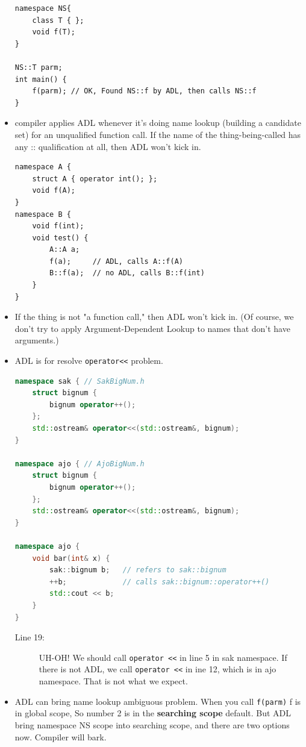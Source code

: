 \documentclass[a4paper,11pt,twoside]{book}
\begin{document}
\begin{itemize}
\begin{lstlisting}[numbers=none]
namespace NS{
	class T { };
	void f(T);
}
	
NS::T parm;
int main() {
	f(parm); // OK, Found NS::f by ADL, then calls NS::f
}
\end{lstlisting}

\item compiler applies ADL whenever it's doing name lookup (building a candidate set) for an unqualified function call. If the name of the thing-being-called has any :: qualification at all, then ADL won't kick in.

\begin{lstlisting}[numbers=none]
namespace A {
	struct A { operator int(); };
	void f(A);
}
namespace B {
	void f(int);
	void test() {
		A::A a;
		f(a);     // ADL, calls A::f(A)
		B::f(a);  // no ADL, calls B::f(int)
	}	
}
\end{lstlisting}

\item  If the thing is not "a function call," then ADL won't kick in. (Of course, we don't try to apply Argument-Dependent Lookup to names that don't have arguments.) 
	
\item ADL is for resolve \texttt{operator<<} problem.
\begin{lstlisting}[frame=single, language=c++]
namespace sak { // SakBigNum.h
	struct bignum {
		bignum operator++();
	};
	std::ostream& operator<<(std::ostream&, bignum); 
}

namespace ajo { // AjoBigNum.h
	struct bignum {
		bignum operator++();
	};
	std::ostream& operator<<(std::ostream&, bignum);
}
	
namespace ajo {
	void bar(int& x) {
		sak::bignum b;   // refers to sak::bignum
		++b;             // calls sak::bignum::operator++()
		std::cout << b;  
	}
}
\end{lstlisting}
\begin{description}
	\item[Line 19:] UH-OH! We should call \texttt{operator <<} in line 5 in sak namespace. If there is not ADL, we call \texttt{operator <<} in ine 12, which is in ajo namespace. That is not what we expect. 
\end{description}
	
	
	
	\item ADL can bring name lookup ambiguous problem.  When you call \texttt{f(parm)} f is in global scope, So number 2 is in the \textbf{searching scope} default. But ADL bring namespace NS scope into searching scope, and there are two options now. Compiler will bark.
	

\end{itemize}
\end{document}
